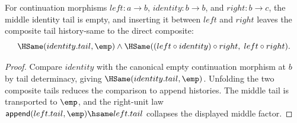 \begin{theorem}
\label{thm:continuation-morphism-comp-middle-identity-tail-result}
For continuation morphisms $left:a\to b$, $identity:b\to b$, and
$right:b\to c$, the middle identity tail is empty, and inserting it between
$left$ and $right$ leaves the composite tail history-same to the direct
composite:
$$
\HSame(identity.tail,\emp)\wedge
\HSame((left\circ identity)\circ right,\; left\circ right).
$$
\end{theorem}
\begin{proof}
Compare $identity$ with the canonical empty continuation morphism at $b$ by
tail determinacy, giving $\HSame(identity.tail,\emp)$. Unfolding the two
composite tails reduces the comparison to append histories. The middle tail
is transported to $\emp$, and the right-unit law
$\mathsf{append}(left.tail,\emp)\hsame left.tail$ collapses the displayed
middle factor.
\end{proof}
